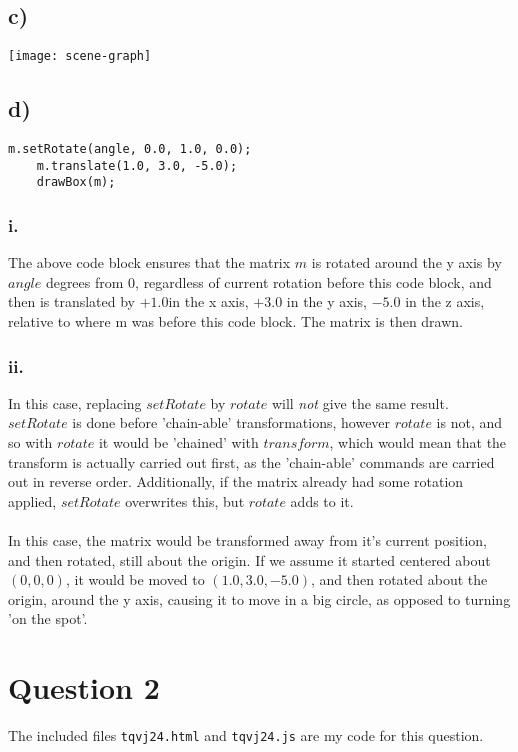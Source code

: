 \documentclass[a4paper,12pt]{article}
\begin{document}
\subsection*{c)}
\texttt{[image: scene-graph]}
\newpage
\subsection*{d)}
\begin{lstlisting}[title=Explaining the meaning]
    m.setRotate(angle, 0.0, 1.0, 0.0);
    m.translate(1.0, 3.0, -5.0);
    drawBox(m);
\end{lstlisting}
\subsubsection*{i.}

The above code block ensures that the matrix $m$ is rotated around the y axis by $angle$ degrees from $0$, regardless of current rotation before this code block, and then is translated by $+1.0$in the x axis, $+3.0$ in the y axis, $-5.0$ in the z axis, relative to where m was before this code block. The matrix is then drawn.
\subsubsection*{ii.}
In this case, replacing $setRotate$ by $rotate$ will \textit{not} give the same result. $setRotate$ is done before 'chain-able' transformations, however $rotate$ is not, and so with $rotate$ it would be 'chained' with $transform$, which would mean that the transform is actually carried out first, as the 'chain-able' commands are carried out in reverse order. Additionally, if the matrix already had some rotation applied, $setRotate$ overwrites this, but $rotate$ adds to it.\\\\In this case, the matrix would be transformed away from it's current position, and then rotated, still about the origin. If we assume it started centered about $(0,0,0)$, it would be moved to $(1.0, 3.0, -5.0)$, and then rotated about the origin, around the y axis, causing it to move in a big circle, as opposed to turning 'on the spot'.

\section*{Question 2}
The included files \texttt{tqvj24.html} and \texttt{tqvj24.js} are my code for this question.
\end{document}
